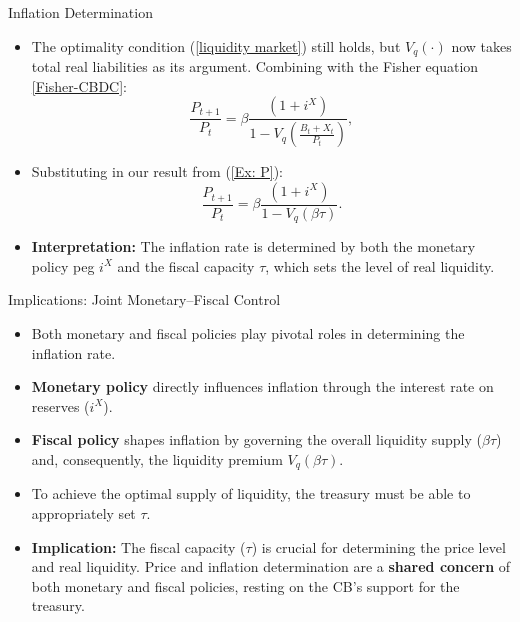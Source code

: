 \documentclass[11pt,aspectratio=169]{beamer}
\begin{document}
\begin{frame}{Inflation Determination}
\small
\begin{itemize}
\item The optimality condition (\ref{liquidity market}) still holds, but $V_q(\cdot)$ now takes total real liabilities as its argument. Combining with the Fisher equation \eqref{Fisher-CBDC}:
\begin{equation*}
\frac{P_{t+1}}{P_{t}}=\beta \frac{(1+i^{X})}{1-V_{q}\left( \frac{B_{t}+X_{t}}{P_{t}}\right) },
\end{equation*}
\item Substituting in our result from (\ref{Ex: P}):
\begin{equation}
\frac{P_{t+1}}{P_{t}}=\beta \frac{(1+i^{X})}{1-V_{q}\left( \beta \tau \right) }. \label{InflLiquidity}
\end{equation}
\item \textbf{Interpretation:} The inflation rate is determined by both the monetary policy peg $i^X$ and the fiscal capacity $\tau$, which sets the level of real liquidity.
\end{itemize}
\end{frame}


\begin{frame}{Implications: Joint Monetary--Fiscal Control}
\small
\begin{itemize}
\item Both monetary and fiscal policies play pivotal roles in determining the inflation rate.

    \item \textbf{Monetary policy} directly influences inflation through the interest rate on reserves ($i^X$).
    \item \textbf{Fiscal policy} shapes inflation by governing the overall liquidity supply ($\beta\tau$) and, consequently, the liquidity premium $V_q(\beta\tau)$.
    \item To achieve the optimal supply of liquidity, the treasury must be able to appropriately set $\tau$.
\item \textbf{Implication:} The fiscal capacity ($\tau$) is crucial for determining the price level and real liquidity. Price and inflation determination are a \textbf{shared concern} of both monetary and fiscal policies, resting on the CB's support for the treasury.
\end{itemize}
\end{frame}
\end{document}

